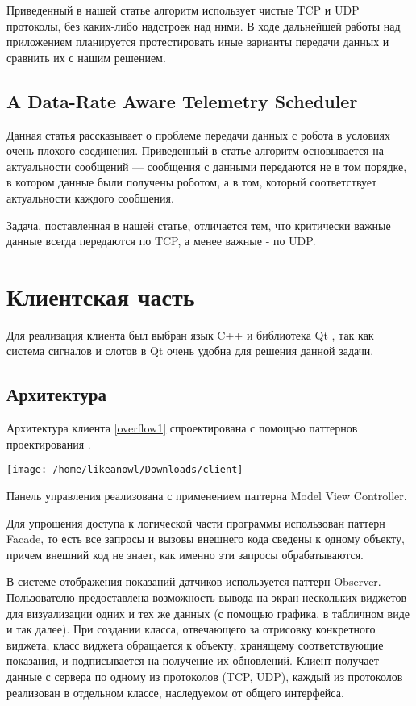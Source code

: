 \documentclass[conference]{IEEEtran}
\begin{document}
Приведенный в нашей статье алгоритм использует чистые TCP и UDP протоколы, без каких-либо надстроек над ними. В ходе дальнейшей работы над приложением планируется протестировать иные варианты передачи данных и сравнить их с нашим решением.

\subsection{A Data-Rate Aware Telemetry Scheduler}

Данная статья \cite{paper2} рассказывает о проблеме передачи данных с робота в условиях очень плохого соединения. Приведенный в статье алгоритм основывается на актуальности сообщений --- сообщения с данными передаются не в том порядке, в котором данные были получены роботом, а в том, который соответствует актуальности каждого сообщения.

Задача, поставленная в нашей статье, отличается тем, что критически важные данные всегда передаются по TCP, а менее важные - по UDP. 

\section{Клиентская часть}
Для реализация клиента был выбран язык C++ и библиотека Qt \cite{qt}, так как система сигналов и слотов в Qt очень удобна для решения данной задачи. 


\subsection{Архитектура}
Архитектура клиента \ref{overflow1} спроектирована с помощью паттернов проектирования \cite{gof}.

\begin{figure*}
\centering
\texttt{[image: /home/likeanowl/Downloads/client]}
\caption{Архитектура клиентской части \label{overflow1}}
\end{figure*}

Панель управления реализована с применением паттерна Model View Controller.


Для упрощения доступа к логической части программы использован паттерн Facade, то есть все запросы и вызовы внешнего кода сведены к одному объекту, причем внешний код не знает, как именно эти запросы обрабатываются.


В системе отображения показаний датчиков используется паттерн Observer. Пользователю предоставлена возможность вывода на экран нескольких виджетов для визуализации одних и тех же данных (с помощью графика, в табличном виде и так далее). При создании класса, отвечающего за отрисовку конкретного виджета, класс виджета обращается к объекту, хранящему соответствующие показания, и подписывается на получение их обновлений.
Клиент получает данные с сервера по одному из протоколов (TCP, UDP), каждый из протоколов реализован в отдельном классе, наследуемом от общего интерфейса. 
\end{document}
